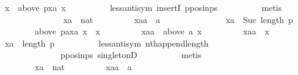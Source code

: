 \begin{isabellebody}
\ {\isachardoublequoteopen}x\ {\isasymin}\ above\ {\isacharparenleft}{\kern0pt}p{\isacharbang}{\kern0pt}xa{\isacharparenright}{\kern0pt}\ x{\isachardoublequoteclose}\isanewline
\ \ \ \ \ \ \ \ \isamarkupfalse%
\ less{\isacharunderscore}{\kern0pt}antisym\ insertI{}\ p{\isacharunderscore}{\kern0pt}pos{\isacharunderscore}{\kern0pt}in{\isacharunderscore}{\kern0pt}ps\isanewline
\ \ \ \ \ \ \ \ \isamarkupfalse%
\ metis\isanewline
\ \ \ \ \isamarkupfalse%
\isanewline
\ \ \ \ \ \ \isamarkupfalse%
\isanewline
\ \ \ \ \ \ \ \ xa\ {\isacharcolon}{\kern0pt}{\isacharcolon}{\kern0pt}\ nat\ \isanewline
\ \ \ \ \ \ \ \ xaa\ {\isacharcolon}{\kern0pt}{\isacharcolon}{\kern0pt}\ {\isachardoublequoteopen}{\isacharprime}{\kern0pt}a{\isachardoublequoteclose}\isanewline
\ \ \ \ \ \ \isamarkupfalse%
\isanewline
\ \ \ \ \ \ \ \ {\isachardoublequoteopen}xa\ {\isacharless}{\kern0pt}\ Suc\ {\isacharparenleft}{\kern0pt}length\ p{\isacharparenright}{\kern0pt}{\isachardoublequoteclose}\ \isanewline
\ \ \ \ \ \ \ \ {\isachardoublequoteopen}above\ {\isacharparenleft}{\kern0pt}{\isacharparenleft}{\kern0pt}p{\isacharat}{\kern0pt}{\isacharbrackleft}{\kern0pt}a{\isacharbrackright}{\kern0pt}{\isacharparenright}{\kern0pt}{\isacharbang}{\kern0pt}xa{\isacharparenright}{\kern0pt}\ x\ {\isacharequal}{\kern0pt}\ {\isacharbraceleft}{\kern0pt}x{\isacharbraceright}{\kern0pt}{\isachardoublequoteclose}\ \isanewline
\ \ \ \ \ \ \ \ {\isachardoublequoteopen}xaa\ {\isasymin}\ above\ a\ x{\isachardoublequoteclose}\ \isanewline
\ \ \ \ \ \ \ \ {\isachardoublequoteopen}xaa\ {\isasymnoteq}\ x{\isachardoublequoteclose}\isanewline
\ \ \ \ \ \ \isamarkupfalse%
\ {\isachardoublequoteopen}xa\ {\isacharless}{\kern0pt}\ length\ p{\isachardoublequoteclose}\isanewline
\ \ \ \ \ \ \ \ \isamarkupfalse%
\ less{\isacharunderscore}{\kern0pt}antisym\ nth{\isacharunderscore}{\kern0pt}append{\isacharunderscore}{\kern0pt}length\isanewline
\ \ \ \ \ \ \ \ \ \ \ \ \ \ p{\isacharunderscore}{\kern0pt}pos{\isacharunderscore}{\kern0pt}in{\isacharunderscore}{\kern0pt}ps\ singletonD\isanewline
\ \ \ \ \ \ \ \ \isamarkupfalse%
\ metis\isanewline
\ \ \ \ \isamarkupfalse%
\isanewline
\ \ \ \ \ \ \isamarkupfalse%
\isanewline
\ \ \ \ \ \ \ \ xa\ {\isacharcolon}{\kern0pt}{\isacharcolon}{\kern0pt}\ nat\ \isanewline
\ \ \ \ \ \ \ \ xaa\ {\isacharcolon}{\kern0pt}{\isacharcolon}{\kern0pt}\ {\isachardoublequoteopen}{\isacharprime}{\kern0pt}a{\isachardoublequoteclose}\ \isanewline

\end{isabellebody}
